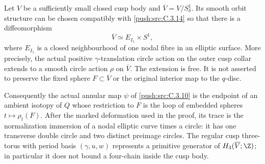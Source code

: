 \begin{proposition}\label{push:src:C.3.17}
Let $V$ be a sufficiently small closed cusp body and
$\overline V=V/S^1_\delta$. Its smooth orbit structure can be
chosen compatibly with \ref{push:src:C.3.14} so that there is a diffeomorphism
\[
 \overline V\simeq E_{I_1}\times S^1,
\]
where $E_{I_1}$ is a closed neighbourhood of one nodal fibre in
an elliptic surface. More precisely, the actual positive
$\gamma$-translation circle action on the outer cusp collar
extends to a smooth circle action $\rho$ on $\overline V$.
The extension is free. It is not asserted to preserve the
fixed sphere $F\subset\overline V$ or the original interior
map to the $q$-disc.

Consequently the actual annular map $\psi$ of \ref{push:src:C.3.10} is the
endpoint of an ambient isotopy of $Q$ whose restriction to $F$
is the loop of embedded spheres $t\mapsto\rho_t(F)$.
After the marked deformation used in the proof, its trace is
the normalization immersion of a nodal elliptic curve times a
circle: it has one transverse double circle and two distinct
preimage circles. The regular cusp three-torus with period
basis $(\gamma,u,w)$ represents a primitive generator of
$H_3(\overline V;\Z)$; in particular it does not bound a
four-chain inside the cusp body.
\end{proposition}
